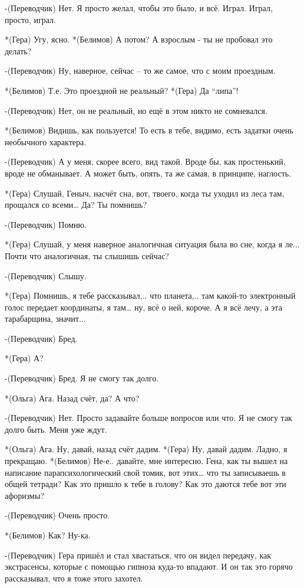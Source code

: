 -(Переводчик) Нет. Я просто желал, чтобы это было, и всё. Играл. Играл, просто, играл.

*(Гера) Угу, ясно.
*(Белимов) А потом? А взрослым - ты не пробовал это делать?

-(Переводчик) Ну, наверное, сейчас – то же самое, что с моим проездным.

*(Белимов) Т.е. Это проездной не реальный?
*(Гера) Да “липа”!

-(Переводчик) Нет, он не реальный, но ещё в этом никто не сомневался.

*(Белимов) Видишь, как пользуется! То есть в тебе, видимо, есть задатки очень необычного  характера.

-(Переводчик) А у меня, скорее всего, вид такой. Вроде бы, как простенький, вроде не обманывает. А может быть, опять,  та же самая, в принципе, наглость.

*(Гера) Слушай, Геныч, насчёт сна, вот, твоего, когда ты уходил из леса там, прощался со всеми… Да? Ты помнишь?

-(Переводчик) Помню.

*(Гера) Слушай, у меня наверное аналогичная ситуация была во сне, когда я ле... Почти что  аналогичная, ты слышишь сейчас?

-(Переводчик) Слышу.

*(Гера) Помнишь, я тебе рассказывал,.. что планета,.. там какой-то электронный голос передает координаты, я там… ну, всё о ней, короче. А я всё лечу, а эта тарабарщина, значит...

-(Переводчик) Бред.

*(Гера) А?

-(Переводчик) Бред. Я не смогу так долго.

*(Ольга) Ага. Назад счёт, да? А что?

-(Переводчик) Нет. Просто задавайте больше вопросов или что. Я не смогу так долго быть. Меня уже ждут.

*(Ольга) Ага. Ну, давай, назад счёт дадим.
*(Гера) Ну, давай дадим. Ладно, я прекращаю.
*(Белимов) Не-е..  давайте, мне интересно. Гена, как ты вышел на написание парапсихологический свой томик, вот этих… что ты записываешь в общей тетради? Как это пришло к тебе в голову? Как это даются тебе вот эти афоризмы?

-(Переводчик) Очень просто.

*(Белимов) Как? Ну-ка.

-(Переводчик) Гера пришёл и стал хвастаться, что он видел передачу, как экстрасенсы, которые с помощью гипноза куда-то впадают. И он так это горячо рассказывал, что я тоже этого захотел.

